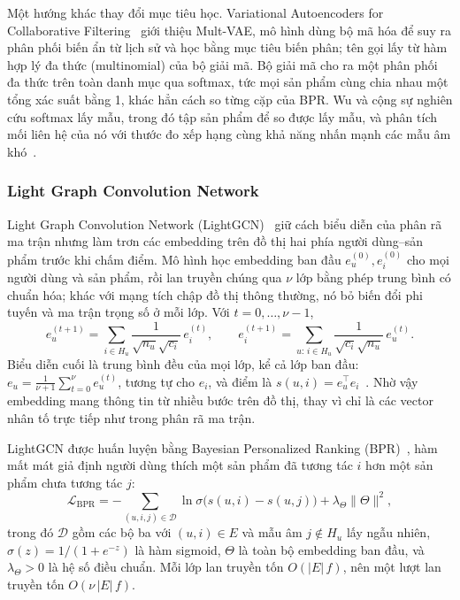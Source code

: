 Một hướng khác thay đổi mục tiêu học. Variational Autoencoders for Collaborative Filtering~\cite{liang2018multvae} giới thiệu Mult-VAE, mô hình dùng bộ mã hóa để suy ra phân phối biến ẩn từ lịch sử và học bằng mục tiêu biến phân; tên gọi lấy từ hàm hợp lý đa thức (multinomial) của bộ giải mã. Bộ giải mã cho ra một phân phối đa thức trên toàn danh mục qua softmax, tức mọi sản phẩm cùng chia nhau một tổng xác suất bằng 1, khác hẳn cách so từng cặp của BPR. Wu và cộng sự nghiên cứu softmax lấy mẫu, trong đó tập sản phẩm để so được lấy mẫu, và phân tích mối liên hệ của nó với thước đo xếp hạng cùng khả năng nhấn mạnh các mẫu âm khó~\cite{wu2024sampledsoftmax}.

\subsubsection{Light Graph Convolution Network}
\label{sec:lightgcn}

Light Graph Convolution Network (LightGCN)~\cite{he2020lightgcn} giữ cách biểu diễn của phân rã ma trận nhưng làm trơn các embedding trên đồ thị hai phía người dùng--sản phẩm trước khi chấm điểm. Mô hình học embedding ban đầu $e_u^{(0)}, e_i^{(0)}$ cho mọi người dùng và sản phẩm, rồi lan truyền chúng qua $\nu$ lớp bằng phép trung bình có chuẩn hóa; khác với mạng tích chập đồ thị thông thường, nó bỏ biến đổi phi tuyến và ma trận trọng số ở mỗi lớp. Với $t=0,\dots,\nu-1$,
\begin{equation}
e_u^{(t+1)} = \sum_{i\in H_u}\frac{1}{\sqrt{n_u}\sqrt{c_i}}\,e_i^{(t)}, \qquad
e_i^{(t+1)} = \sum_{u:\,i\in H_u}\frac{1}{\sqrt{c_i}\sqrt{n_u}}\,e_u^{(t)}.
\label{eq:lightgcn}
\end{equation}
Biểu diễn cuối là trung bình đều của mọi lớp, kể cả lớp ban đầu: $e_u=\frac{1}{\nu+1}\sum_{t=0}^{\nu}e_u^{(t)}$, tương tự cho $e_i$, và điểm là $s(u,i)=e_u^\top e_i$~\cite{he2020lightgcn}. Nhờ vậy embedding mang thông tin từ nhiều bước trên đồ thị, thay vì chỉ là các vector nhân tố trực tiếp như trong phân rã ma trận.

LightGCN được huấn luyện bằng Bayesian Personalized Ranking (BPR)~\cite{rendle2009bpr}, hàm mất mát giả định người dùng thích một sản phẩm đã tương tác $i$ hơn một sản phẩm chưa tương tác $j$:
\begin{equation}
\mathcal{L}_{\mathrm{BPR}}=-\sum_{(u,i,j)\in\mathcal{D}}\ln\sigma\bigl(s(u,i)-s(u,j)\bigr)+\lambda_\Theta\|\Theta\|^2 ,
\label{eq:bpr}
\end{equation}
trong đó $\mathcal{D}$ gồm các bộ ba với $(u,i)\in E$ và mẫu âm $j\notin H_u$ lấy ngẫu nhiên, $\sigma(z)=1/(1+e^{-z})$ là hàm sigmoid, $\Theta$ là toàn bộ embedding ban đầu, và $\lambda_\Theta>0$ là hệ số điều chuẩn. Mỗi lớp lan truyền tốn $O(|E|\,f)$, nên một lượt lan truyền tốn $O(\nu\,|E|\,f)$.

